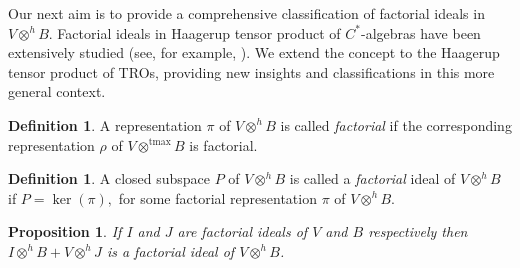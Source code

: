 \documentclass{birkjour}
\newtheorem{prop}[thm]{Proposition}
\theoremstyle{definition}
\newtheorem{defn}[thm]{Definition}
\theoremstyle{remark}
\numberwithin{equation}{section}
\begin{document}
 Our next aim is to provide a comprehensive classification of factorial ideals in \( V \otimes^h B \). Factorial ideals in Haagerup tensor product of \( C^* \)-algebras have been extensively studied (see, for example, \cite{AR}). We extend the concept to the Haagerup tensor product of TROs, providing new insights and classifications in this more general context. 



\begin{defn}
     A representation $\pi$ of \( V \otimes^h B \) is called \emph{factorial} if the corresponding representation $\rho$ of \( V \otimes^{\text{tmax}} B \) is factorial.
\end{defn}


\begin{defn}
    A closed subspace $P$ of $V \otimes^h B$ is called a \emph{factorial} ideal of $V \otimes^h B$ if $P= \operatorname{ker}(\pi),$ for some  factorial representation $\pi$ of $V \otimes^h B$.
\end{defn}





\begin{prop}\label{facmain3}
    If $I$ and $J$ are factorial ideals of $V$ and $B$ respectively then $I \otimes^h B+ V \otimes^h J$ is a factorial ideal of $V \otimes^h B$.
\end{prop}
    
\end{document}

